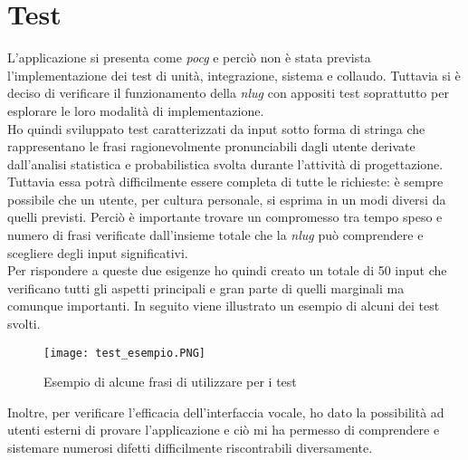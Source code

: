 \section{Test}
L'applicazione si presenta come \emph{\gls{pocg}} e perciò non è stata prevista l'implementazione dei test di unità, integrazione, sistema e collaudo. Tuttavia si è deciso di verificare il funzionamento della \emph{\gls{nlug}} con appositi test soprattutto per esplorare le loro modalità di implementazione. \\
Ho quindi sviluppato test caratterizzati da input sotto forma di stringa che rappresentano le frasi ragionevolmente pronunciabili dagli utente derivate dall'analisi statistica e probabilistica svolta durante l'attività di progettazione. Tuttavia essa potrà difficilmente essere completa di tutte le richieste: è sempre possibile che un utente, per cultura personale, si esprima in un modi diversi da quelli previsti. Perciò è importante trovare un compromesso tra tempo speso e numero di frasi verificate dall'insieme totale che la \emph{\gls{nlug}} può comprendere e scegliere degli input significativi. \\
Per rispondere a queste due esigenze ho quindi creato un totale di 50 input che verificano tutti gli aspetti principali e gran parte di quelli marginali ma comunque importanti. In seguito viene illustrato un esempio di alcuni dei test svolti.
\begin{figure}[htbp]
	\begin{center}
		\texttt{[image: test\_esempio.PNG]}
		\caption{Esempio di alcune frasi di utilizzare per i test}
	\end{center}
\end{figure}
Inoltre, per verificare l'efficacia dell'interfaccia vocale, ho dato la possibilità ad utenti esterni di provare l'applicazione e ciò mi ha permesso di comprendere e sistemare numerosi difetti difficilmente riscontrabili diversamente.
